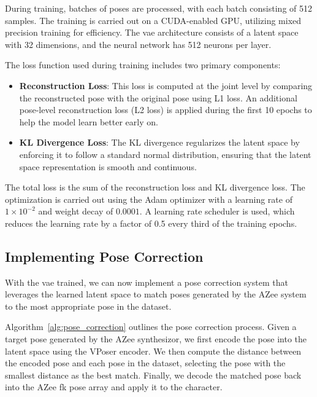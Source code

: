 \documentclass[../../main.tex]{subfiles}
\begin{document}
During training, batches of poses are processed, with each batch consisting of 512 samples. The training is carried out on a CUDA-enabled GPU, utilizing mixed precision training for efficiency. The \gls{vae} architecture consists of a latent space with 32 dimensions, and the neural network has 512 neurons per layer. 

The loss function used during training includes two primary components: 
\begin{itemize}
    \item \textbf{Reconstruction Loss}: This loss is computed at the joint level by comparing the reconstructed pose with the original pose using L1 loss. An additional pose-level reconstruction loss (L2 loss) is applied during the first 10 epochs to help the model learn better early on.
    \item \textbf{KL Divergence Loss}: The KL divergence regularizes the latent space by enforcing it to follow a standard normal distribution, ensuring that the latent space representation is smooth and continuous.
\end{itemize}

The total loss is the sum of the reconstruction loss and KL divergence loss. The optimization is carried out using the Adam optimizer with a learning rate of $1 \times 10^{-2}$ and weight decay of $0.0001$. A learning rate scheduler is used, which reduces the learning rate by a factor of 0.5 every third of the training epochs. 

\subsection{Implementing Pose Correction}
\label{ch:pose_correction:pose_correction_with_azee:implementation}

With the \gls{vae} trained, we can now implement a pose correction system that leverages the learned latent space to match poses generated by the AZee system to the most appropriate pose in the dataset.

Algorithm~\ref{alg:pose_correction} outlines the pose correction process. Given a target pose generated by the AZee synthesizor, we first encode the pose into the latent space using the VPoser encoder. We then compute the distance between the encoded pose and each pose in the dataset, selecting the pose with the smallest distance as the best match. Finally, we decode the matched pose back into the AZee \gls{fk} pose array and apply it to the character.
\end{document}
